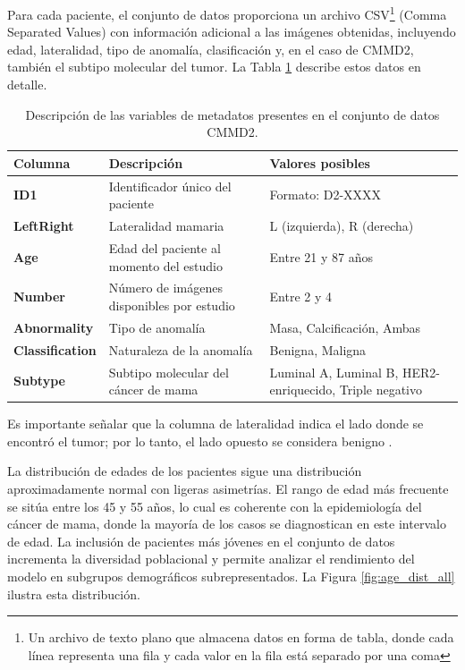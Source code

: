\documentclass[a4paper,10pt]{book}
\begin{document}
Para cada paciente, el conjunto de datos proporciona un archivo CSV\footnote{Un archivo de texto plano que almacena datos en forma de tabla, donde cada línea representa una fila y cada valor en la fila está separado por una coma} (Comma Separated Values) con información adicional a las imágenes obtenidas, incluyendo edad, lateralidad, tipo de anomalía, clasificación y, en el caso de CMMD2, también el subtipo molecular del tumor. La Tabla \ref{tab:cmmd2_metadata} describe estos datos en detalle.

\begin{table}[h!]
    \caption[Descripción de los metadatos de CMMD2]{Descripción de las variables de metadatos presentes en el conjunto de datos CMMD2.}
    \centering
    \begin{tabular}{>{\bfseries}l p{5cm} p{6cm}}
    \toprule
    \textbf{Columna} & \textbf{Descripción} & \textbf{Valores posibles} \\
    \midrule
    ID1 & Identificador único del paciente & Formato: D2-XXXX \\
    LeftRight & Lateralidad mamaria & L (izquierda), R (derecha) \\
    Age & Edad del paciente al momento del estudio & Entre 21 y 87 años \\
    Number & Número de imágenes disponibles por estudio & Entre 2 y 4 \\
    Abnormality & Tipo de anomalía & Masa, Calcificación, Ambas \\
    Classification & Naturaleza de la anomalía & Benigna, Maligna \\
    Subtype & Subtipo molecular del cáncer de mama & Luminal A, Luminal B, HER2-enriquecido, Triple negativo \\
    \bottomrule
    \end{tabular}

	\label{tab:cmmd2_metadata}
\end{table}

Es importante señalar que la columna de lateralidad indica el lado donde se encontró el tumor; por lo tanto, el lado opuesto se considera benigno \cite{cai_online_2023}.

La distribución de edades de los pacientes sigue una distribución aproximadamente normal con ligeras asimetrías. El rango de edad más frecuente se sitúa entre los 45 y 55 años, lo cual es coherente con la epidemiología del cáncer de mama, donde la mayoría de los casos se diagnostican en este intervalo de edad. La inclusión de pacientes más jóvenes en el conjunto de datos incrementa la diversidad poblacional y permite analizar el rendimiento del modelo en subgrupos demográficos subrepresentados. La Figura \ref{fig:age_dist_all} ilustra esta distribución.
\end{document}
